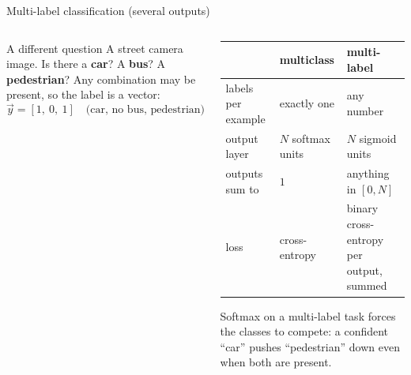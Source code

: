 \documentclass[aspectratio=169,10pt]{beamer}
\begin{document}
\begin{frame}{Multi-label classification (several outputs)}
  \begin{columns}[T,onlytextwidth]
    \begin{column}{0.5\textwidth}
      \begin{block}{A different question}
        \footnotesize
        A street camera image. Is there a \textbf{car}? A \textbf{bus}? A
        \textbf{pedestrian}? Any combination may be present, so the label is a vector:
        \[ \vec{y}=[1,\ 0,\ 1] \quad\text{(car, no bus, pedestrian)}. \]
      \end{block}
      \centering
    \end{column}
    \begin{column}{0.46\textwidth}
      \footnotesize
      \renewcommand{\arraystretch}{1.2}
      \begin{tabular}{@{}L{1.6cm}L{2.2cm}L{2.4cm}@{}}
        \toprule
        & multiclass & multi-label\\
        \midrule
        labels per example & exactly one & any number\\
        output layer & $N$ softmax units & $N$ sigmoid units\\
        outputs sum to & $1$ & anything in $[0,N]$\\
        loss & cross-entropy & binary cross-entropy per output, summed\\
        \bottomrule
      \end{tabular}
      \begin{pitfall}
        \footnotesize Softmax on a multi-label task forces the classes to compete: a
        confident ``car'' pushes ``pedestrian'' down even when both are present.
      \end{pitfall}
    \end{column}
  \end{columns}
\end{frame}
\end{document}
